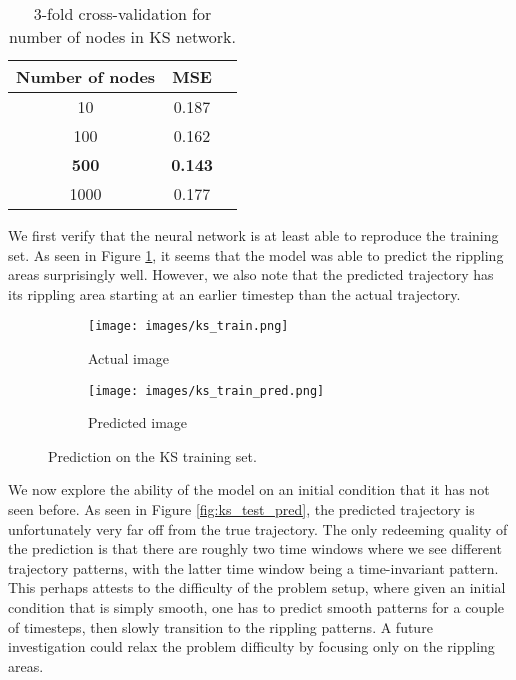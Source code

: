 \documentclass[letterpaper, 10 pt, conference]{ieeeconf}  %
\begin{document}
\begin{table}[ht]
\caption{3-fold cross-validation for number of nodes in KS network.} %
\centering %
\begin{tabular}{c c c} 
\hline\hline 
Number of nodes & MSE \\
\hline
10 & 0.187 \\
100 & 0.162 \\
\textbf{500} & \textbf{0.143} \\
1000 & 0.177 \\
\end{tabular}
\label{table:ks_cv} %
\end{table}

We first verify that the neural network is at least able to reproduce the training set.
As seen in Figure \ref{fig:ks_train_pred}, it seems that the model was able to predict the rippling areas surprisingly well. However, we also note that the predicted trajectory has its rippling area starting at an earlier timestep than the actual trajectory. 

\begin{figure}[htb]
\centering
\begin{subfigure}{.5\columnwidth}
  \centering
  \texttt{[image: images/ks\_train.png]}
  \caption{Actual image}
\end{subfigure}%
\begin{subfigure}{.5\columnwidth}
  \centering
  \texttt{[image: images/ks\_train\_pred.png]}
  \caption{Predicted image}
\end{subfigure}
\caption{Prediction on the KS training set.}
\label{fig:ks_train_pred}
\end{figure}

We now explore the ability of the model on an initial condition that it has not seen before. As seen in Figure \ref{fig:ks_test_pred}, the predicted trajectory is unfortunately very far off from the true trajectory. The only redeeming quality of the prediction is that there are roughly two time windows where we see different trajectory patterns, with the latter time window being a time-invariant pattern. This perhaps attests to the difficulty of the problem setup, where given an initial condition that is simply smooth, one has to predict smooth patterns for a couple of timesteps, then slowly transition to the rippling patterns. A future investigation could relax the problem difficulty by focusing only on the rippling areas.
\end{document}
